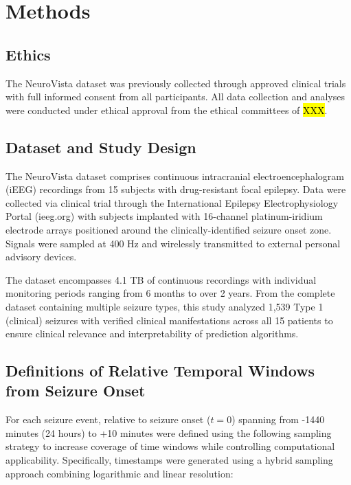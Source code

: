 

\section{Methods}

\subsection{Ethics}
The NeuroVista dataset was previously collected through approved clinical trials with full informed consent from all participants. All data collection and analyses were conducted under ethical approval from the ethical committees of \hl{XXX}. 

\subsection{Dataset and Study Design}
The NeuroVista dataset \cite{Kuhlmann2018SeizurePA} comprises continuous intracranial electroencephalogram (iEEG) recordings from 15 subjects with drug-resistant focal epilepsy. Data were collected via clinical trial through the International Epilepsy Electrophysiology Portal (ieeg.org) with subjects implanted with 16-channel platinum-iridium electrode arrays positioned around the clinically-identified seizure onset zone. Signals were sampled at 400 Hz and wirelessly transmitted to external personal advisory devices.

The dataset encompasses 4.1 TB of continuous recordings with individual monitoring periods ranging from 6 months to over 2 years. From the complete dataset containing multiple seizure types, this study analyzed 1,539 Type 1 (clinical) seizures with verified clinical manifestations across all 15 patients to ensure clinical relevance and interpretability of prediction algorithms.

\subsection{Definitions of Relative Temporal Windows from Seizure Onset}
For each seizure event, relative to seizure onset ($t = 0$) spanning from -1440 minutes (24 hours) to +10 minutes were defined using the following sampling strategy to increase coverage of time windows while controlling computational applicability. Specifically, timestamps were generated using a hybrid sampling approach combining logarithmic and linear resolution:

